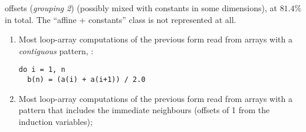 offsets (\emph{grouping 2}) (possibly mixed with constants in some
dimensions), at $81.4\%$ in total. The ``affine + constants'' class is
not represented at all.
%
\begin{enumerate}[resume]
\item Most loop-array computations of the previous form read
from arrays with a \emph{contiguous} pattern, \eg{}:
%
\begin{verbatim}
do i = 1, n
  b(n) = (a(i) + a(i+1)) / 2.0
\end{verbatim}
%
\item Most loop-array computations of the previous form read
from arrays with a pattern that includes the immediate
neighbours (offsets of 1 from the induction variables);
\end{enumerate}
%
